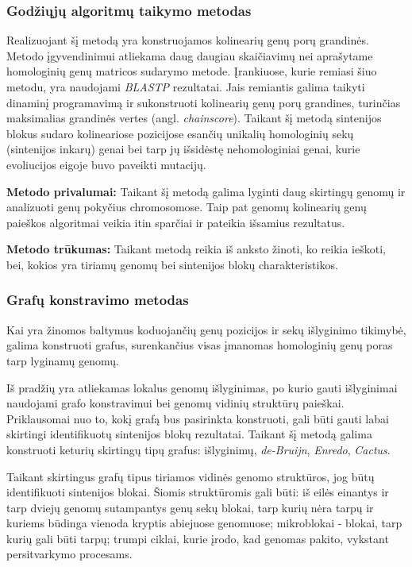 \documentclass[12pt]{article}
\begin{document}
\subsubsection*{Godžiųjų algoritmų taikymo metodas}
Realizuojant šį metodą yra konstruojamos kolinearių genų porų grandinės. Metodo
į\-gy\-ven\-di\-ni\-mui atliekama daug daugiau skaičiavimų nei aprašytame
homologinių genų matricos sudarymo metode. Įrankiuose, kurie remiasi šiuo
metodu, yra naudojami \emph{BLASTP} rezultatai. Jais remiantis galima taikyti
dinaminį programavimą ir sukonstruoti kolinearių genų porų grandines, turinčias
maksimalias grandinės vertes (angl. \emph{chainscore}). Taikant šį metodą
sintenijos blokus sudaro kolineariose pozicijose esančių unikalių homologinių
sekų (sintenijos inkarų) genai bei tarp jų išsidėstę nehomologiniai genai, kurie
evoliucijos eigoje buvo paveikti mutacijų.

\textbf{Metodo privalumai:} Taikant šį metodą galima lyginti daug skirtingų
genomų ir analizuoti genų pokyčius chromosomose. Taip pat genomų kolinearių
genų paieškos algoritmai veikia itin sparčiai ir pateikia išsamius rezultatus.

\textbf{Metodo trūkumas:} Taikant metodą reikia iš anksto žinoti, ko reikia
ieškoti, bei, kokios yra tiriamų genomų bei sintenijos blokų charakteristikos.

\subsubsection*{Grafų konstravimo metodas}
Kai yra žinomos baltymus koduojančių genų pozicijos ir sekų išlyginimo tikimybė,
galima konstruoti grafus, surenkančius visas įmanomas homologinių genų poras
tarp lyginamų genomų.

Iš pradžių yra atliekamas lokalus genomų išlyginimas, po kurio gauti išlyginimai
naudojami grafo konstravimui bei genomų vidinių struktūrų paieškai. Priklausomai
nuo to, kokį grafą bus pasirinkta konstruoti, gali būti gauti labai skirtingi
identifikuotų sintenijos blokų rezultatai. Taikant šį metodą galima konstruoti
keturių skirtingų tipų grafus: išlyginimų, \emph{de-Bruijn}, \emph{Enredo},
\emph{Cactus}.

Taikant skirtingus grafų tipus tiriamos vidinės genomo struktūros, jog būtų
identifikuoti sintenijos blokai. Šiomis struktūromis gali būti: iš eilės
einantys ir tarp dviejų genomų sutampantys genų sekų blokai, tarp kurių nėra
tarpų ir kuriems būdinga vienoda kryptis abiejuose genomuose; mikroblokai -
blokai, tarp kurių gali būti tarpų; trumpi ciklai, kurie įrodo, kad genomas
pakito, vykstant persitvarkymo procesams.
\end{document}
